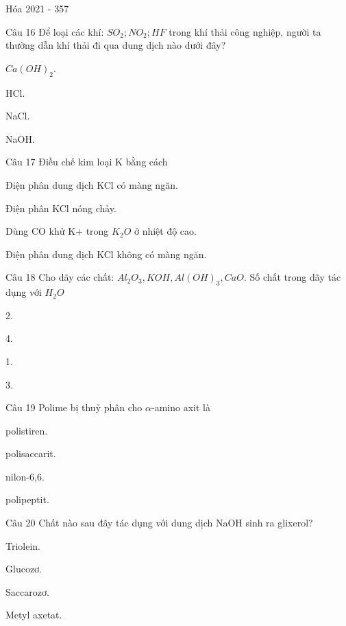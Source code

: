 \documentclass{book}
\begin{document}
\begin{quiz}{Hóa 2021 - 357}
\begin{multi}[points=1]{Câu 16}
 Để loại các khí: $SO_2; NO_2; HF$ trong khí thải công nghiệp, người ta thường dẫn khí thải đi qua dung dịch nào dưới đây? 

\item*  $Ca(OH)_2$.	
\item  HCl.	
\item  NaCl.	
\item  NaOH.
\end{multi}

\begin{multi}[points=1]{Câu 17}
 Điều chế kim loại K bằng cách

\item  Điện phân dung dịch KCl có màng ngăn.	
\item*  Điện phân KCl nóng chảy.	
\item  Dùng CO khử K+ trong $K_2O$ ở nhiệt độ cao.	
\item  Điện phân dung dịch KCl không có màng ngăn.
\end{multi}

\begin{multi}[points=1]{Câu 18}
 Cho dãy các chất: $Al_2O_3, KOH, Al(OH)_3, CaO$. Số chất trong dãy tác dụng với $H_2O$

\item  2.	
\item  4.	
\item*  1.	
\item  3.
\end{multi}

\begin{multi}[points=1]{Câu 19}
 Polime bị thuỷ phân cho $\alpha$-amino axit là

\item  polistiren.	
\item  polisaccarit.	
\item  nilon-6,6.	
\item*  polipeptit.
\end{multi}

\begin{multi}[points=1]{Câu 20}
 Chất nào sau đây tác dụng với dung dịch NaOH sinh ra glixerol? 

\item*  Triolein.	
\item  Glucozơ.	
\item  Saccarozơ.	
\item  Metyl axetat.
\end{multi}


\end{quiz}
\end{document}

